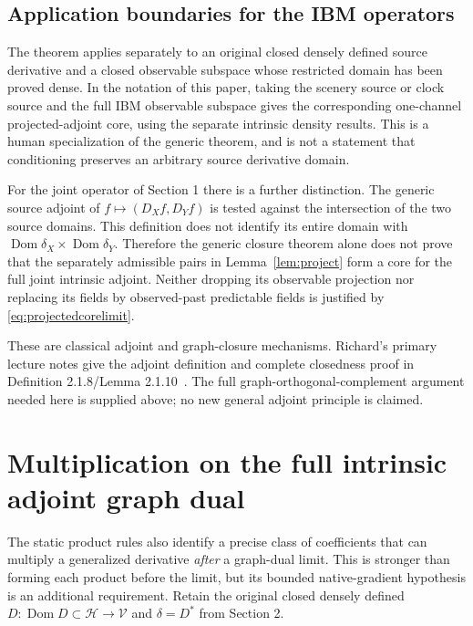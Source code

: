 \documentclass[11pt]{article}
\newcommand{\Hh}{\mathcal H}\newcommand{\Dom}{\operatorname{Dom}}
\begin{document}
\subsection*{Application boundaries for the IBM operators}
The theorem applies separately to an original closed densely defined
source derivative and a closed observable subspace whose restricted
domain has been proved dense. In the notation of this paper, taking
the scenery source or clock source and the full IBM observable
subspace gives the corresponding one-channel projected-adjoint core,
using the separate intrinsic density results. This is a human
specialization of the generic theorem, and is not a statement that
conditioning preserves an arbitrary source derivative domain.

For the joint operator of Section 1 there is a further distinction.
The generic source adjoint of $f\mapsto(D_Xf,D_Yf)$ is tested against
the intersection of the two source domains. This definition does
not identify its entire domain with
$\Dom\delta_X\times\Dom\delta_Y$. Therefore the generic closure
theorem alone does not prove that the separately admissible pairs
in Lemma~\ref{lem:project} form a core for the full joint intrinsic
adjoint. Neither dropping its observable projection nor replacing
its fields by observed-past predictable fields is justified by
\eqref{eq:projectedcorelimit}.

These are classical adjoint and graph-closure mechanisms. Richard's
primary lecture notes give the adjoint definition and complete
closedness proof in Definition 2.1.8/Lemma 2.1.10~\cite{richard}.
The full graph-orthogonal-complement argument needed here is supplied
above; no new general adjoint principle is claimed.

\section{Multiplication on the full intrinsic adjoint graph dual}
The static product rules also identify a precise class of coefficients
that can multiply a generalized derivative \emph{after} a graph-dual
limit. This is stronger than forming each product before the limit,
but its bounded native-gradient hypothesis is an additional requirement.
Retain the original closed densely defined
$D:\Dom D\subset\Hh\to\mathcal V$ and $\delta=D^*$ from Section 2.
\end{document}
